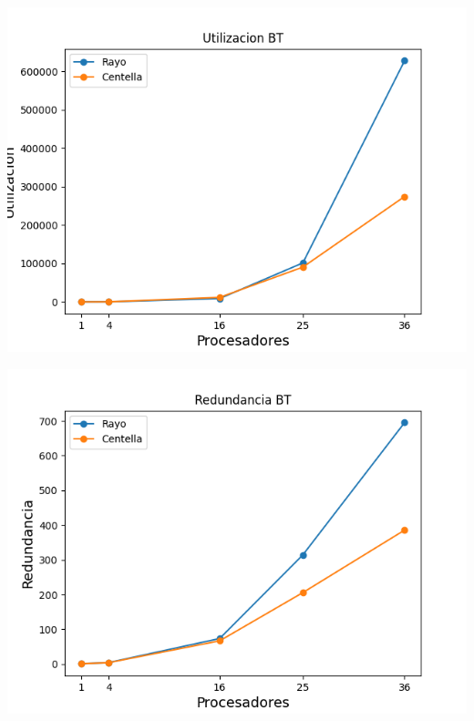 \begin{center}
 \centering
  \begin{minipage}[b]{.49\textwidth}
  \includegraphics[width=1\linewidth]{plots/utilizacion-bt.png}
 \end{minipage}
 \begin{minipage}[b]{.49\textwidth}
  \includegraphics[width=1\linewidth]{plots/redundancy-bt.png}
 \end{minipage}
\end{center}

